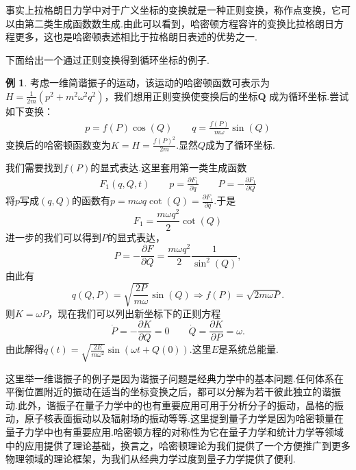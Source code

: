 \documentclass[UTF8,10.5pt,a4paper]{ctexart}
\numberwithin{equation}{section}
\theoremstyle{definition}
\theoremstyle{definition}
\newtheorem{exmp}{例\hspace{0.05pt}}[section]
\begin{document}
事实上拉格朗日力学中对于广义坐标的变换就是一种正则变换，称作点变换，它可以由第二类生成函数数生成.由此可以看到，哈密顿方程容许的变换比拉格朗日方程更多，这也是哈密顿表述相比于拉格朗日表述的优势之一.
\par 下面给出一个通过正则变换得到循环坐标的例子.
\begin{exmp}
考虑一维简谐振子的运动，该运动的哈密顿函数可表示为$H= \frac{1}{2m}\left( p^{2} + m^{2}\omega^{2}q^{2} \right)$，我们想用正则变换使变换后的坐标$\textbf{Q}$ 成为循环坐标.尝试如下变换：
\begin{align*}
p = f(P)\cos\left( Q \right) \qquad q =
\frac{f(P)}{m\omega}\sin\left( Q \right)
\end{align*}
变换后的哈密顿函数变为$K = H = \frac{f(P)^{2}}{2m}$.显然$Q$成为了循环坐标.
\par 我们需要找到$f(P)$的显式表达.这里套用第一类生成函数
\begin{align*}
F_{1}(q ,Q,t) \qquad p = \frac{\partial F_1}{\partial q} \qquad P =
-\frac{\partial F_1}{\partial Q}
\end{align*}
将$p$写成$(q,Q)$的函数有$p = m\omega q \cot (Q) = \frac{\partial F_1}{\partial q}$.于是
$$F_1 = \frac{m\omega q^{2}}{2}\cot (Q)$$
进一步的我们可以得到$P$的显式表达，
$$P = -\frac{\partial F}{\partial Q} = \frac{m\omega q^{2}}{2}\frac{1}{\sin^{2}\left( Q \right)},$$
由此有
$$q(Q, P) = \sqrt{\frac{2P}{m\omega}}\sin(Q) \Rightarrow f(P)=\sqrt{2m\omega P}.$$
则$K=\omega P$，现在我们可以列出新坐标下的正则方程
$$\dot{P}= -\frac{\partial K}{\partial Q}=0 \qquad \dot{Q}=\frac{\partial K}{\partial P}=\omega.$$
由此解得$q(t)=\sqrt{\frac{2E}{m\omega^2}}\sin(\omega t+Q(0))$.这里$E$是系统总能量.
\end{exmp}
这里举一维谐振子的例子是因为谐振子问题是经典力学中的基本问题.任何体系在平衡位置附近的振动在适当的坐标变换之后，都可以分解为若干彼此独立的谐振动.此外，谐振子在量子力学中的也有重要应用可用于分析分子的振动，晶格的振动，原子核表面振动以及辐射场的振动等等.这里提到量子力学是因为哈密顿量在量子力学中也有重要应用.哈密顿方程的对称性为它在量子力学和统计力学等领域中的应用提供了理论基础，换言之，哈密顿理论为我们提供了一个方便推广到更多物理领域的理论框架，为我们从经典力学过度到量子力学提供了便利.

\newpage
\end{document}
